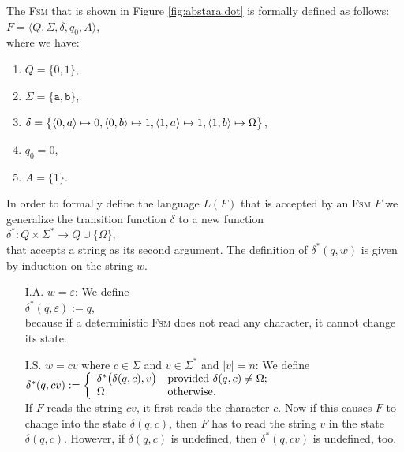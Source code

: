\exampleEng
The \textsc{Fsm} that is shown in Figure  \ref{fig:abstara.dot} is formally defined as follows:
\\[0.2cm]
\hspace*{1.3cm}
$F = \langle Q, \Sigma, \delta, q_0, A \rangle$,
\\[0.2cm]
where we have:
\begin{enumerate}
\item $Q = \{ 0, 1 \}$,
\item $\Sigma = \{ \texttt{a}, \texttt{b} \}$,
\item $\delta = \bigl\{ 
                        \pair(0,a) \mapsto 0, 
                        \pair(0,b) \mapsto 1, 
                        \pair(1,a) \mapsto 1, 
                        \pair(1,b) \mapsto \Omega 
                \bigr\}$,
\item $q_0 = 0$,
\item $A = \{ 1 \}$.
\end{enumerate}
In order to formally define the language $L(F)$ that is accepted by an \textsc{Fsm} $F$
we generalize the transition function $\delta$ to a new function
\\[0.2cm]
\hspace*{1.3cm}
$\delta^*: Q \times \Sigma^* \rightarrow Q \cup \{ \Omega \}$,
\\[0.2cm]
that accepts a string as its second argument.  The definition of
$\delta^*(q, w)$ is given by induction on the string $w$.
\begin{enumerate}
\item[I.A.] $w = \varepsilon$:  We define
            \\[0.2cm]
            \hspace*{1.3cm}
            $\delta^*(q, \varepsilon) := q$,
            \\[0.2cm]
            because if a deterministic \textsc{Fsm} does not read any character, it cannot change its state. 
\item[I.S.] $w = cv$ where $c \in \Sigma$ and $v  \in \Sigma^*$ and $|v| = n$:  We define
            \\[0.2cm]
            \hspace*{1.3cm}
            $\delta^*(q, cv) := \left\{
            \begin{array}[c]{ll}              
            \delta^*\bigl(\delta(q,c),v\bigr) & \mbox{provided $\delta(q,c) \not= \Omega$;} \\
            \Omega                            & \mbox{otherwise}.
            \end{array}
            \right.
            $
            \\[0.2cm]
            If $F$ reads the string  $cv$, it first reads the character $c$.  Now if this causes  $F$
            to change into the state $\delta(q,c)$, then $F$ has to read the string $v$ in the state
            $\delta(q,c)$.  However, 
            if  $\delta(q,c)$ is undefined, then  $\delta^*(q,cv)$ is undefined, too.
\end{enumerate}


